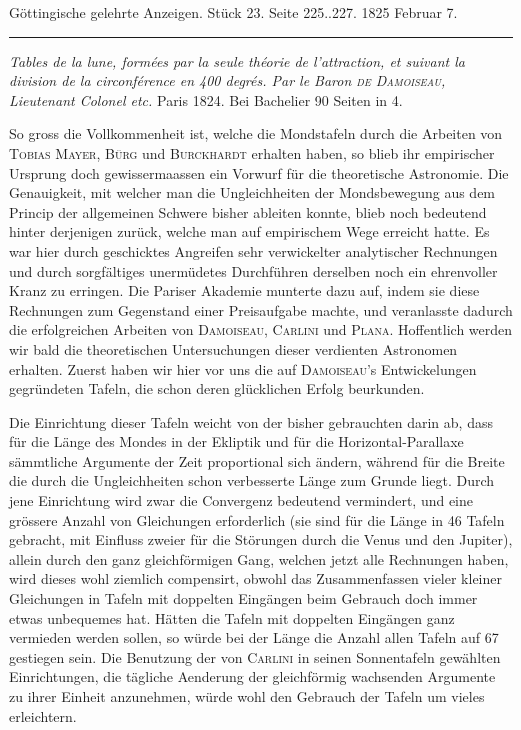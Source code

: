 \clearpage
{}
\begin{center}\small Göttingische gelehrte Anzeigen. Stück 23. Seite 225..227. 1825 Februar 7.\\[3pt]\rule{.72\linewidth}{.3pt}\end{center}

\emph{Tables de la lune, formées par la seule théorie de l'attraction, et suivant la division de la circonférence en \textup{400} degrés. Par le Baron \textup{\textsc{de Damoiseau}}, Lieutenant Colonel etc.} Paris 1824. Bei Bachelier 90 Seiten in 4.

So gross die Vollkommenheit ist, welche die Mondstafeln durch die Arbeiten von \textsc{Tobias Mayer}, \textsc{Bürg} und \textsc{Burckhardt} erhalten haben, so blieb ihr empirischer Ursprung doch gewissermaassen ein Vorwurf für die theoretische Astronomie. Die Genauigkeit, mit welcher man die Ungleichheiten der Mondsbewegung aus dem Princip der allgemeinen Schwere bisher ableiten konnte, blieb noch bedeutend hinter derjenigen zurück, welche man auf empirischem Wege erreicht hatte. Es war hier durch geschicktes Angreifen sehr verwickelter analytischer Rechnungen und durch sorgfältiges unermüdetes Durchführen derselben noch ein ehrenvoller Kranz zu erringen. Die Pariser Akademie munterte dazu auf, indem sie diese Rechnungen zum Gegenstand einer Preisaufgabe machte, und veranlasste dadurch die erfolgreichen Arbeiten von \textsc{Damoiseau}, \textsc{Carlini} und \textsc{Plana}. Hoffentlich werden wir bald die theoretischen Untersuchungen dieser verdienten Astronomen erhalten. Zuerst haben wir hier vor uns die auf \textsc{Damoiseau}'s Entwickelungen gegründeten Tafeln, die schon deren glücklichen Erfolg beurkunden.

Die Einrichtung dieser Tafeln weicht von der bisher gebrauchten darin ab, dass für die Länge des Mondes in der Ekliptik und für die Horizontal-Parallaxe sämmtliche Argumente der Zeit proportional sich ändern, während für die Breite die durch die Ungleichheiten schon verbesserte Länge zum Grunde liegt. Durch jene Einrichtung wird zwar die Convergenz bedeutend vermindert, und eine grössere Anzahl von Gleichungen erforderlich (sie sind für die Länge in 46 Tafeln gebracht, mit Einfluss zweier für die Störungen durch die Venus und den Jupiter), allein durch den ganz gleichförmigen Gang, welchen jetzt alle Rechnungen haben, wird dieses wohl ziemlich compensirt, obwohl das Zusammenfassen vieler kleiner Gleichungen in Tafeln mit doppelten Eingängen beim Gebrauch doch immer etwas unbequemes hat. Hätten die Tafeln mit doppelten Eingängen ganz vermieden werden sollen, so würde bei der Länge die Anzahl allen Tafeln auf 67 gestiegen sein. Die Benutzung der von \textsc{Carlini} in seinen Sonnentafeln gewählten Einrichtungen, die tägliche Aenderung der gleichförmig wachsenden Argumente zu ihrer Einheit anzunehmen, würde wohl den Gebrauch der Tafeln um vieles erleichtern.

